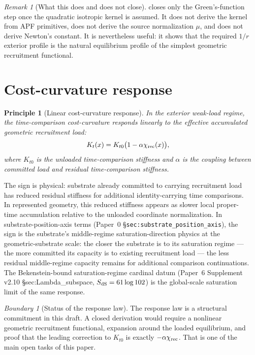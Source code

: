 \documentclass[11pt]{article}
\newtheorem{principle}[theorem]{Principle}
\theoremstyle{remark}
\newtheorem{remark}[theorem]{Remark}
\newtheorem{warning}[theorem]{Boundary}
\begin{document}
\begin{remark}[What this does and does not close]
 closes only the Green's-function step once the quadratic isotropic kernel is assumed.  It does not derive the kernel from APF primitives, does not derive the source normalization \(\mu\), and does not derive Newton's constant.  It is nevertheless useful: it shows that the required \(1/r\) exterior profile is the natural equilibrium profile of the simplest geometric recruitment functional.
\end{remark}

\section{Cost-curvature response}

\begin{principle}[Linear cost-curvature response]
In the exterior weak-load regime, the time-comparison cost-curvature responds linearly to the effective accumulated geometric recruitment load:
\[
        K_t(x)=K_{t0}\bigl(1-\alpha\chi_{\rm rec}(x)\bigr),
\]
where \(K_{t0}\) is the unloaded time-comparison stiffness and \(\alpha\) is the coupling between committed load and residual time-comparison stiffness.
\end{principle}

The sign is physical: substrate already committed to carrying recruitment load has reduced residual stiffness for additional identity-carrying time comparisons.  In represented geometry, this reduced stiffness appears as slower local proper-time accumulation relative to the unloaded coordinate normalization. In substrate-position-axis terms (Paper~0 \S\texttt{sec:substrate\_position\_axis}), the sign is the substrate's middle-regime saturation-direction physics at the geometric-substrate scale: the closer the substrate is to its saturation regime --- the more committed its capacity is to existing recruitment load --- the less residual middle-regime capacity remains for additional comparison continuations. The Bekenstein-bound saturation-regime cardinal datum (Paper~6 Supplement v2.10 \S sec:Lambda\_subspace, $S_{\rm dS} = 61\log 102$) is the global-scale saturation limit of the same response.

\begin{warning}[Status of the response law]
The response law is a structural commitment in this draft.  A closed derivation would require a nonlinear geometric recruitment functional, expansion around the loaded equilibrium, and proof that the leading correction to \(K_{t0}\) is exactly \(-\alpha\chi_{\rm rec}\).  That is one of the main open tasks of this paper.
\end{warning}
\end{document}
